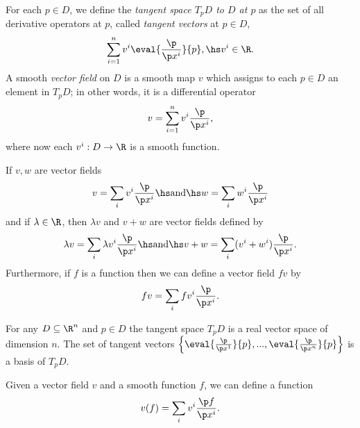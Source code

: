 \documentclass{article}
\begin{document}
\begin{definition}
    For each $p\in D$, we define the \emph{tangent space $T_pD$ to $D$ at $p$} as the
    set of all derivative operators at $p$, called \emph{tangent vectors} at $p\in D$,
    \begin{align*}
        \sum_{i=1}^n v^i \eval{\frac{\p}{\p x^i}}{p},\hs v^i\in\R.
    \end{align*}
    A smooth \emph{vector field} on $D$ is a smooth map $v$ which assigns to each $p\in D$
    an element in $T_p D$; in other words, it is a differential operator
    \begin{align*}
        v = \sum_{i=1}^n v^i \frac{\p}{\p x^i},
    \end{align*}
    where now each $v^i:D\to\R$ is a smooth function.
\end{definition}

\begin{definition}
    If $v,w$ are vector fields
    \begin{align*}
        v = \sum_i v^i \frac{\p}{\p x^i}\hs\text{and}\hs w = \sum_i w^i \frac{\p }{\p x^i}
    \end{align*}
    and if $\lambda\in\R$, then $\lambda v$ and $v+w$ are vector fields defined by
    \begin{align*}
        \lambda v = \sum_i \lambda v^i \frac{\p }{\p x^i}\hs\text{and}\hs
        v+w = \sum_i (v^i+w^i)\frac{\p }{\p x^i}.
    \end{align*}
    Furthermore, if $f$ is a function then we can define a vector field $fv$ by
    \begin{align*}
        fv = \sum_i fv^i\frac{\p }{\p x^i}.
    \end{align*}
\end{definition}

\begin{theorem}[Notes 4.4]
    For any $D\subseteq \R^n$ and $p\in D$ the tangent space $T_pD$ is a real vector space
    of dimension $n$. The set of tangent vectors 
    $\left\lbrace\eval{\frac{\p }{\p x^1}}{p}, ...,\eval{\frac{\p }{\p x^n}}{p}\right\rbrace$
    is a basis of $T_pD$.
\end{theorem}

\begin{definition}
    Given a vector field $v$ and a smooth function $f$, we can define a function 
    \begin{align*}
        v(f) = \sum_i v^i\frac{\p f}{\p x^i}.
    \end{align*}
\end{definition}
\end{document}
